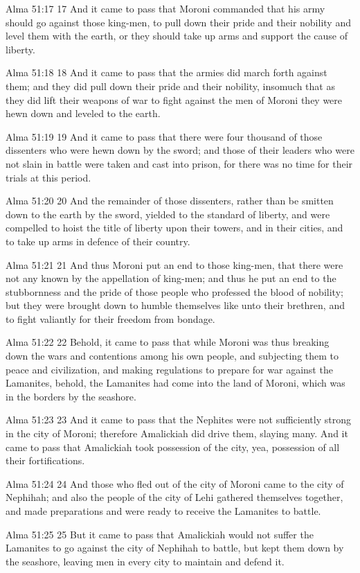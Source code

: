 Alma 51:17
 17 And it came to pass that Moroni commanded that his army
should go against those king-men, to pull down their pride and
their nobility and level them with the earth, or they should take
up arms and support the cause of liberty.

Alma 51:18
 18 And it came to pass that the armies did march forth against
them; and they did pull down their pride and their nobility,
insomuch that as they did lift their weapons of war to fight
against the men of Moroni they were hewn down and leveled to the
earth.

Alma 51:19
 19 And it came to pass that there were four thousand of those
dissenters who were hewn down by the sword; and those of their
leaders who were not slain in battle were taken and cast into
prison, for there was no time for their trials at this period.

Alma 51:20
 20 And the remainder of those dissenters, rather than be smitten
down to the earth by the sword, yielded to the standard of
liberty, and were compelled to hoist the title of liberty upon
their towers, and in their cities, and to take up arms in defence
of their country.

Alma 51:21
 21 And thus Moroni put an end to those king-men, that there were
not any known by the appellation of king-men; and thus he put an
end to the stubbornness and the pride of those people who
professed the blood of nobility; but they were brought down to
humble themselves like unto their brethren, and to fight
valiantly for their freedom from bondage.

Alma 51:22
 22 Behold, it came to pass that while Moroni was thus breaking
down the wars and contentions among his own people, and
subjecting them to peace and civilization, and making regulations
to prepare for war against the Lamanites, behold, the Lamanites
had come into the land of Moroni, which was in the borders by the
seashore.

Alma 51:23
 23 And it came to pass that the Nephites were not sufficiently
strong in the city of Moroni; therefore Amalickiah did drive
them, slaying many. And it came to pass that Amalickiah took
possession of the city, yea, possession of all their
fortifications.

Alma 51:24
 24 And those who fled out of the city of Moroni came to the city
of Nephihah; and also the people of the city of Lehi gathered
themselves together, and made preparations and were ready to
receive the Lamanites to battle.

Alma 51:25
 25 But it came to pass that Amalickiah would not suffer the
Lamanites to go against the city of Nephihah to battle, but kept
them down by the seashore, leaving men in every city to maintain
and defend it.

